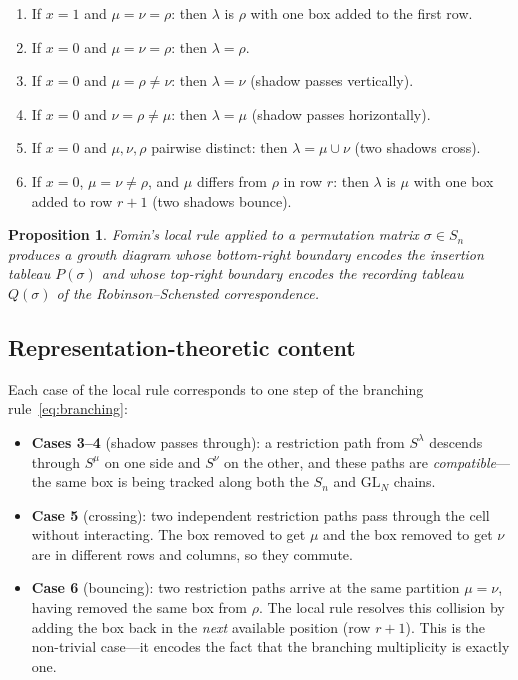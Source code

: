 \documentclass[12pt,a4paper]{article}
\newtheorem{proposition}[theorem]{Proposition}
\theoremstyle{definition}
\theoremstyle{remark}
\begin{document}
\begin{enumerate}
\item If $x = 1$ and $\mu = \nu = \rho$: then $\lambda$ is $\rho$
  with one box added to the first row.
\item If $x = 0$ and $\mu = \nu = \rho$: then $\lambda = \rho$.
\item If $x = 0$ and $\mu = \rho \neq \nu$: then $\lambda = \nu$
  (shadow passes vertically).
\item If $x = 0$ and $\nu = \rho \neq \mu$: then $\lambda = \mu$
  (shadow passes horizontally).
\item If $x = 0$ and $\mu, \nu, \rho$ pairwise distinct: then
  $\lambda = \mu \cup \nu$ (two shadows cross).
\item If $x = 0$, $\mu = \nu \neq \rho$, and $\mu$ differs from
  $\rho$ in row $r$: then $\lambda$ is $\mu$ with one box added to
  row $r+1$ (two shadows bounce).
\end{enumerate}

\begin{proposition}
Fomin's local rule applied to a permutation matrix $\sigma \in S_n$
produces a growth diagram whose bottom-right boundary encodes the
insertion tableau $P(\sigma)$ and whose top-right boundary encodes the
recording tableau $Q(\sigma)$ of the Robinson--Schensted correspondence.
\end{proposition}

\subsection{Representation-theoretic content}

Each case of the local rule corresponds to one step of the branching
rule~\eqref{eq:branching}:

\begin{itemize}
\item \textbf{Cases 3--4} (shadow passes through): a restriction path
  from $S^\lambda$ descends through $S^\mu$ on one side and $S^\nu$
  on the other, and these paths are \emph{compatible}---the same box
  is being tracked along both the $S_n$ and $\mathrm{GL}_N$ chains.

\item \textbf{Case 5} (crossing): two independent restriction paths
  pass through the cell without interacting. The box removed to get
  $\mu$ and the box removed to get $\nu$ are in different rows and
  columns, so they commute.

\item \textbf{Case 6} (bouncing): two restriction paths arrive at the
  same partition $\mu = \nu$, having removed the same box from
  $\rho$. The local rule resolves this collision by adding the box
  back in the \emph{next} available position (row $r+1$). This is the
  non-trivial case---it encodes the fact that the branching
  multiplicity is exactly one.
\end{itemize}
\end{document}
